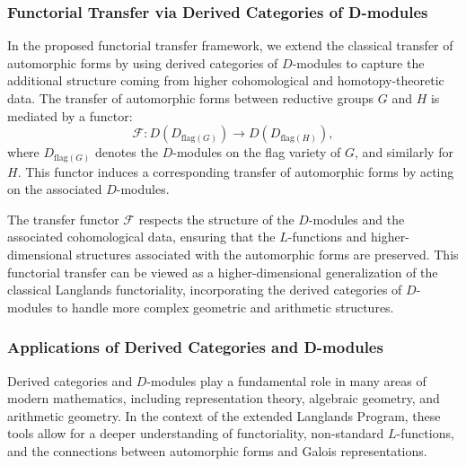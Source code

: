 \documentclass{article}
\theoremstyle{remark}
\begin{document}
\subsubsection{Functorial Transfer via Derived Categories of D-modules}

In the proposed functorial transfer framework, we extend the classical transfer of automorphic forms by using derived categories of $D$-modules to capture the additional structure coming from higher cohomological and homotopy-theoretic data. The transfer of automorphic forms between reductive groups $G$ and $H$ is mediated by a functor:
\[
\mathcal{F}: D(D_{\text{flag}(G)}) \to D(D_{\text{flag}(H)}),
\]
where $D_{\text{flag}(G)}$ denotes the $D$-modules on the flag variety of $G$, and similarly for $H$. This functor induces a corresponding transfer of automorphic forms by acting on the associated $D$-modules.

The transfer functor $\mathcal{F}$ respects the structure of the $D$-modules and the associated cohomological data, ensuring that the $L$-functions and higher-dimensional structures associated with the automorphic forms are preserved. This functorial transfer can be viewed as a higher-dimensional generalization of the classical Langlands functoriality, incorporating the derived categories of $D$-modules to handle more complex geometric and arithmetic structures.

\subsubsection{Applications of Derived Categories and D-modules}

Derived categories and $D$-modules play a fundamental role in many areas of modern mathematics, including representation theory, algebraic geometry, and arithmetic geometry. In the context of the extended Langlands Program, these tools allow for a deeper understanding of functoriality, non-standard $L$-functions, and the connections between automorphic forms and Galois representations.
\end{document}
